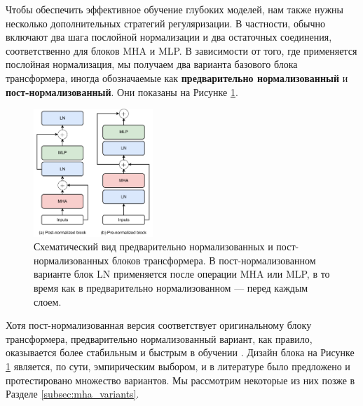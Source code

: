 Чтобы обеспечить эффективное обучение глубоких моделей, нам также нужны несколько дополнительных стратегий регуляризации. В частности, обычно включают два шага послойной нормализации и два остаточных соединения, соответственно для блоков MHA и MLP. В зависимости от того, где применяется послойная нормализация, мы получаем два варианта базового блока трансформера, иногда обозначаемые как \textbf{предварительно нормализованный} и \textbf{пост-нормализованный}. Они показаны на Рисунке \ref{fig:pre_post_normalization}.

\begin{figure}
    \centering
    \hspace{2em}\includegraphics[width=0.4\textwidth]{images/transformer_block}
    \caption{Схематический вид предварительно нормализованных и пост-нормализованных блоков трансформера. В пост-нормализованном варианте блок LN применяется после операции MHA или MLP, в то время как в предварительно нормализованном — перед каждым слоем.}
    \label{fig:pre_post_normalization}
\end{figure}

Хотя пост-нормализованная версия соответствует оригинальному блоку трансформера, предварительно нормализованный вариант, как правило, оказывается более стабильным и быстрым в обучении \cite{xiong2020layer}. Дизайн блока на Рисунке \ref{fig:pre_post_normalization} является, по сути, эмпирическим выбором, и в литературе было предложено и протестировано множество вариантов. Мы рассмотрим некоторые из них позже в Разделе \ref{subsec:mha_variants}.

